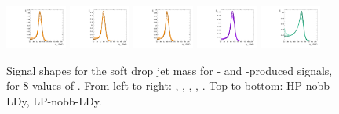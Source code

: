 \begin{figure}[htbp]
  \includegraphics[width=0.18\textwidth]{fig/2Dfit/templateSignalVsMX_fromDC_GbuToWW_MJJ_mu_LP_nobb_LDy.pdf}
  \includegraphics[width=0.18\textwidth]{fig/2Dfit/templateSignalVsMX_fromDC_RadToWW_MJJ_mu_LP_nobb_LDy.pdf}
  \includegraphics[width=0.18\textwidth]{fig/2Dfit/templateSignalVsMX_fromDC_ZprToWW_MJJ_mu_LP_nobb_LDy.pdf}
  \includegraphics[width=0.18\textwidth]{fig/2Dfit/templateSignalVsMX_fromDC_WprToWZ_MJJ_mu_LP_nobb_LDy.pdf}
  \includegraphics[width=0.18\textwidth]{fig/2Dfit/templateSignalVsMX_fromDC_WprToWH_MJJ_mu_LP_nobb_LDy.pdf}\\
  \caption{
    Signal shapes for the soft drop jet mass \MJ for \ggF- and \DY-produced signals, for 8 values of \MX.
    From left to right: \GBulktoWW, \RadtoWW, \ZprtoWW, \WprtoWZ, \WprtoWH.
    Top to bottom: HP-nobb-LDy, LP-nobb-LDy.
  }
  \label{fig:MJJShapes_NonVBF_LDy_Run2}
\end{figure}

